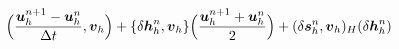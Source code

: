 \documentclass[preview]{standalone}
\newcommand{\bu}{\boldsymbol{u}_h}
\newcommand{\bv}{\boldsymbol{v}_h}
\newcommand{\dbh}{\delta\boldsymbol{h}_h}
\newcommand{\dbs}{\delta\boldsymbol{s}_h}
\begin{document}
\begin{align*}
\special{dvisvgm:raw <g id='unique000'>}\Big(\frac{\bu^{n+1}-\bu^n}{\Delta t},\bv\Big)+\{\dbh^n,\bv\}\Big(\frac{\bu^{n+1}+\bu^n}{2}\Big)+(\dbs^n,\bv)_H(\dbh^n)\special{dvisvgm:raw </g>}
\end{align*}
\end{document}
